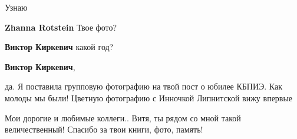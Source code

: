  
 
 
 
 

Узнаю

\textbf{Zhanna Rotstein} Твое фото?

\textbf{Виктор Киркевич} какой год?

\textbf{Виктор Киркевич}, 

да. Я поставила групповую фотографию на твой пост о юбилее КБПИЭ. Как молоды мы
были! Цветную фотографию с Инночкой Липнитской вижу впервые

Мои дорогие и любимые коллеги.. Витя, ты рядом со мной такой величественный!
Спасибо за твои книги, фото, память!
